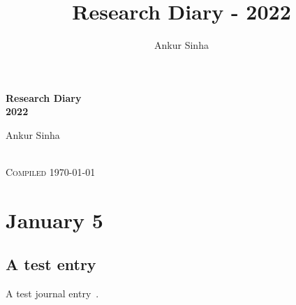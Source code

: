\documentclass[a4paper,twoside,11pt]{report}
\title{Research Diary - 2022}
\author{Ankur Sinha}
\begin{document}
\begin{center} \begin{LARGE}
\textbf{Research Diary} \\[3mm]
\textbf{2022} \\[2cm]
\end{LARGE} \begin{large}
Ankur Sinha \end{large} \\
\textsc{Compiled \today}
\end{center}
\thispagestyle{empty}
\newpage
\tableofcontents
\thispagestyle{empty}



\chapter{January  5}

\section{A test entry}
A test journal entry~\cite{Test2017}.






\newpage
\printbibliography
\printindex
\end{document}
